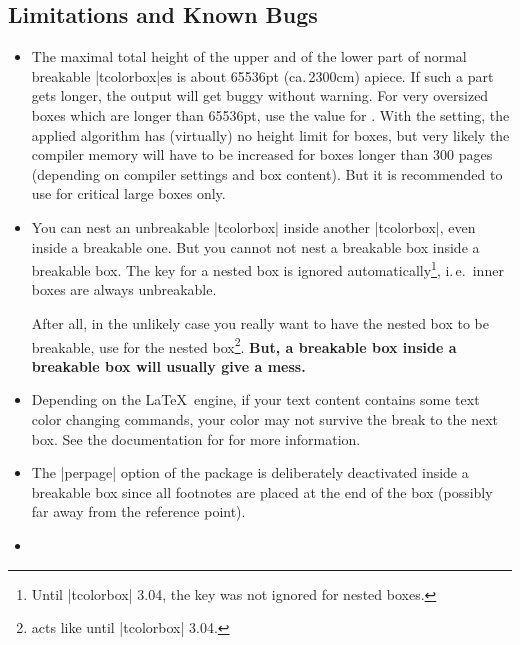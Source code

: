 \subsection{Limitations and Known Bugs}
\begin{itemize}
\item  The maximal total height of the upper and of the lower part
  of normal breakable |tcolorbox|es is about 65536pt (ca.\,2300cm)
  apiece. If such a part gets longer, the output will get buggy
  without warning.
  For very oversized boxes which are longer than 65536pt, use
  the  value for  .
  With the  setting,
  the applied algorithm has (virtually) no height limit for boxes, but
  very likely the compiler memory will have to be increased for boxes longer
  than 300 pages (depending on compiler settings and box content).
  But it is recommended to use  for critical large boxes only.
\item You can nest an unbreakable |tcolorbox| inside another |tcolorbox|,
  even inside a breakable one.
  But you cannot not nest a breakable box inside a breakable box.
  The  key for a nested box is ignored
  automatically\footnote{Until |tcolorbox| 3.04, the  key
  was not ignored for nested boxes.}, i.\,e.\ inner
  boxes are always unbreakable.\par
  After all, in the unlikely case you really want to have the nested box to be breakable,
  use  for the nested
  box\footnote{ acts like  until |tcolorbox| 3.04.}.
  \textbf{But, a breakable box inside a breakable box will usually give a mess.}
\item{}
  Depending on the \LaTeX\ engine, if your text content contains some text
  color changing commands, your color may not survive the break to the next box.
  See the documentation for  for more information.
\item{}
  The |perpage| option of the  package is deliberately deactivated
  inside a breakable box since all footnotes are placed at the end
  of the box (possibly far away from the reference point).
\item{}

\end{itemize}
